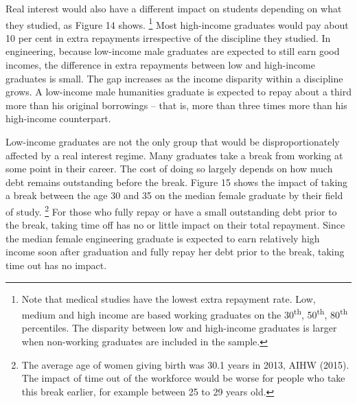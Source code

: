 \documentclass[embargoed]{grattan}
\begin{document}
Real interest would also have a different impact on students depending on what they studied, as Figure 14 shows.%
\footnote{Note that medical studies have the lowest extra repayment rate.
Low, medium and high income are based working graduates on the 30\textsuperscript{th}, 50\textsuperscript{th}, 80\textsuperscript{th} percentiles.
The disparity between low and high-income graduates is larger when non-working graduates are included in the sample.} Most high-income graduates would pay about 10 per cent in extra repayments irrespective of the discipline they studied.
In engineering, because low-income male graduates are expected to still earn good incomes, the difference in extra repayments between low and high-income graduates is small.
The gap increases as the income disparity within a discipline grows.
A low-income male humanities graduate is expected to repay about a third more than his original borrowings -- that is, more than three times more than his high-income counterpart.

Low-income graduates are not the only group that would be disproportionately affected by a real interest regime.
Many graduates take a break from working at some point in their career.
The cost of doing so largely depends on how much debt remains outstanding before the break.
Figure 15 shows the impact of taking a break between the age 30 and 35 on the median female graduate by their field of study.%
\footnote{The average age of women giving birth was 30.1 years in 2013, AIHW (2015).
The impact of time out of the workforce would be worse for people who take this break earlier, for example between 25 to 29 years old.} For those who fully repay or have a small outstanding debt prior to the break, taking time off has no or little impact on their total repayment.
Since the median female engineering graduate is expected to earn relatively high income soon after graduation and fully repay her debt prior to the break, taking time out has no impact.
\end{document}

